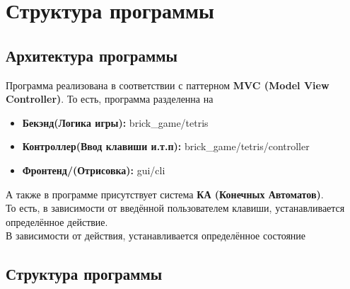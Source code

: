 \documentclass[a4paper, 12pt]{report}
\begin{document}
\clearpage
\chapter {Структура программы}

\section{Архитектура программы}
Программа реализована в соответствии с паттерном \textbf{MVC (Model View Controller)}.
То есть, программа разделенна на 
\begin{itemize}
    \item \textbf{Бекэнд(Логика игры):} brick\_game/tetris
    \item \textbf{Контроллер(Ввод клавиши и.т.п):} brick\_game/tetris/controller
    \item \textbf{Фронтенд/(Отрисовка):} gui/cli
\end{itemize}

А также в программе присутствует система \textbf{КА (Конечных Автоматов)}.\\
То есть, в зависимости от введённой пользователем клавиши, устанавливается определённое действие.\\
В зависимости от действия, устанавливается определённое состояние\\

\clearpage
\section{Структура программы}
\end{document}
